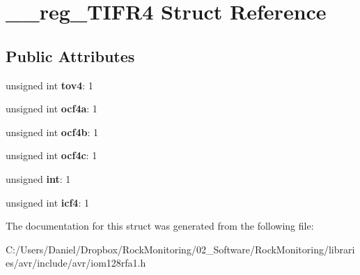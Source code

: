 \hypertarget{struct____reg___t_i_f_r4}{}\section{\+\_\+\+\_\+reg\+\_\+\+T\+I\+F\+R4 Struct Reference}
\label{struct____reg___t_i_f_r4}
\subsection*{Public Attributes}
\begin{DoxyCompactItemize}
\item 
unsigned int {\bfseries tov4}\+: 1\hypertarget{struct____reg___t_i_f_r4_aaf5a4b3b4e961ec3cf22be42e7dcfda7}{}\label{struct____reg___t_i_f_r4_aaf5a4b3b4e961ec3cf22be42e7dcfda7}

\item 
unsigned int {\bfseries ocf4a}\+: 1\hypertarget{struct____reg___t_i_f_r4_ab409c76b6b4bbf62015acd2f9a8ba63e}{}\label{struct____reg___t_i_f_r4_ab409c76b6b4bbf62015acd2f9a8ba63e}

\item 
unsigned int {\bfseries ocf4b}\+: 1\hypertarget{struct____reg___t_i_f_r4_a88e74f35c5d3a08abeb2223d5b78b031}{}\label{struct____reg___t_i_f_r4_a88e74f35c5d3a08abeb2223d5b78b031}

\item 
unsigned int {\bfseries ocf4c}\+: 1\hypertarget{struct____reg___t_i_f_r4_a95198dabcef01226f3297352b685efa6}{}\label{struct____reg___t_i_f_r4_a95198dabcef01226f3297352b685efa6}

\item 
unsigned {\bfseries int}\+: 1\hypertarget{struct____reg___t_i_f_r4_a10aa0172a8545c557cb459d987ca2c05}{}\label{struct____reg___t_i_f_r4_a10aa0172a8545c557cb459d987ca2c05}

\item 
unsigned int {\bfseries icf4}\+: 1\hypertarget{struct____reg___t_i_f_r4_aed167a8762e4fd33ad66b934db690ea1}{}\label{struct____reg___t_i_f_r4_aed167a8762e4fd33ad66b934db690ea1}

\end{DoxyCompactItemize}


The documentation for this struct was generated from the following file\+:\begin{DoxyCompactItemize}
\item 
C\+:/\+Users/\+Daniel/\+Dropbox/\+Rock\+Monitoring/02\+\_\+\+Software/\+Rock\+Monitoring/libraries/avr/include/avr/iom128rfa1.\+h\end{DoxyCompactItemize}
